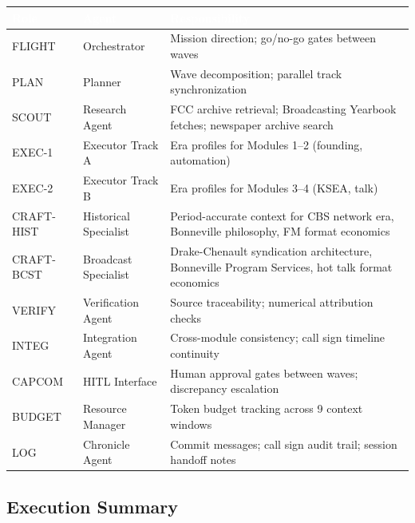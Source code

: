 \documentclass[11pt,letterpaper]{article}
\newcommand{\tableheader}[1]{\textbf{\sffamily\textcolor{white}{#1}}}
\begin{document}
\begin{center}
\begin{tabularx}{\textwidth}{L{1.8cm}L{3cm}X}
\toprule
{}
\tableheader{Role} & \tableheader{Agent} & \tableheader{Responsibility} \\
\midrule
FLIGHT & Orchestrator & Mission direction; go/no-go gates between waves \\
PLAN & Planner & Wave decomposition; parallel track synchronization \\
SCOUT & Research Agent & FCC archive retrieval; Broadcasting Yearbook fetches; newspaper archive search \\
EXEC-1 & Executor Track A & Era profiles for Modules 1--2 (founding, automation) \\
EXEC-2 & Executor Track B & Era profiles for Modules 3--4 (KSEA, talk) \\
CRAFT-HIST & Historical Specialist & Period-accurate context for CBS network era, Bonneville philosophy, FM format economics \\
CRAFT-BCST & Broadcast Specialist & Drake-Chenault syndication architecture, Bonneville Program Services, hot talk format economics \\
VERIFY & Verification Agent & Source traceability; numerical attribution checks \\
INTEG & Integration Agent & Cross-module consistency; call sign timeline continuity \\
CAPCOM & HITL Interface & Human approval gates between waves; discrepancy escalation \\
BUDGET & Resource Manager & Token budget tracking across 9 context windows \\
LOG & Chronicle Agent & Commit messages; call sign audit trail; session handoff notes \\
\bottomrule
\end{tabularx}
\end{center}

\subsection{Execution Summary}
\end{document}
